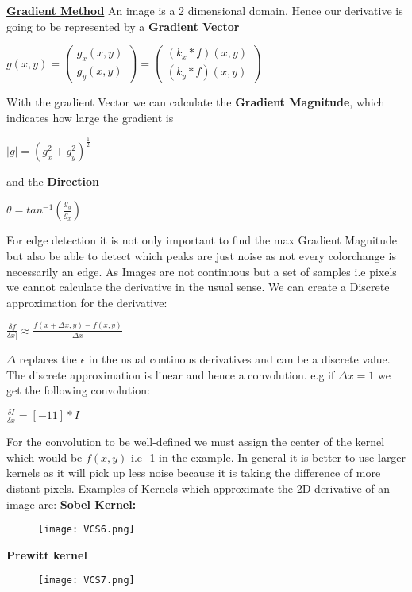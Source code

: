 \documentclass[8pt]{extreport}
\begin{document}
\underline{\textbf{Gradient Method}} An image is a 2 dimensional domain. Hence our derivative is going to be represented by a \textbf{Gradient Vector}
\begin{center}
$g(x,y) =\begin{pmatrix}g_x(x,y)\\g_y(x,y)\end{pmatrix} = \begin{pmatrix}(k_x*f)(x,y)\\(k_y *f)(x,y)\end{pmatrix}$
\end{center}
With the gradient Vector we can calculate the \textbf{Gradient Magnitude}, which indicates how large the gradient is
\begin{center}
$|g| =(g_x^2 + g_y^2)^{\frac{1}{2}}$
\end{center}
and the \textbf{Direction}
\begin{center}
$\theta = tan^{-1}(\frac{g_y}{g_x})$
\end{center}
For edge detection it is not only important to find the max Gradient Magnitude but also be able to detect which peaks are just noise as not every colorchange is necessarily an edge. As Images are not continuous but a set of samples i.e pixels we cannot calculate the derivative in the usual sense. We can create a Discrete approximation for the derivative:
\begin{center}
$\frac{\delta f}{\delta x]} \approx \frac{ f(x+ \Delta x, y) - f(x,y)}{\Delta x}$
\end{center}
$\Delta$ replaces the $\epsilon$ in the usual continous derivatives and can be a discrete value. The discrete approximation is linear and hence a convolution. e.g if $\Delta x = 1$ we get the following convolution:
\begin{center}
$\frac{\delta I}{\delta x} = [-1 1] * I$
\end{center}
For the convolution to be well-defined we must assign the center of the kernel which would be $f(x,y)$ i.e -1 in the example. In general it is better to use larger kernels as it will pick up less noise because it is taking the difference of more distant pixels. Examples of Kernels which approximate the 2D derivative of an image are:
\textbf{Sobel Kernel:}
\begin{figure}[H]
\centering
\texttt{[image: VCS6.png]}
\end{figure}
\textbf{Prewitt kernel}
\begin{figure}[H]
\centering
\texttt{[image: VCS7.png]}
\end{figure}
\end{document}
